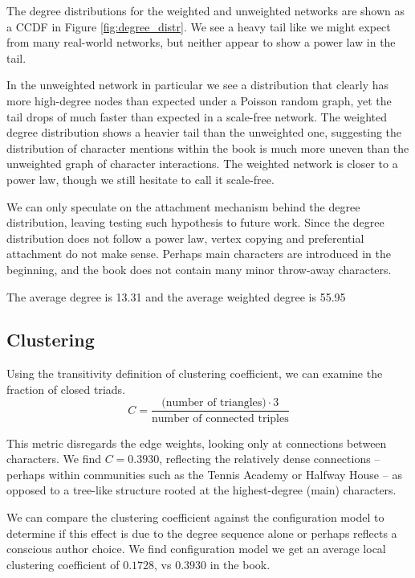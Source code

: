 The degree distributions for the weighted and unweighted networks are shown as a CCDF in Figure \ref{fig:degree_distr}. We see a heavy tail like we might expect from many real-world networks, but neither appear to show a power law in the tail. 

In the unweighted network in particular we see a distribution that clearly has more high-degree nodes than expected under a Poisson random graph, yet the tail drops of much faster than expected in a scale-free network.
The weighted degree distribution shows a heavier tail than the unweighted one, suggesting the distribution of character mentions within the book is much more uneven than the unweighted graph of character interactions. The weighted network is closer to a power law, though we still hesitate to call it scale-free.


We can only speculate on the attachment mechanism behind the degree distribution, leaving testing such hypothesis to future work. Since the degree distribution does not follow a power law, vertex copying and preferential attachment do not make sense. 
Perhaps main characters are introduced in the beginning, and the book does not contain many minor throw-away characters.

The average degree is 13.31 and the average weighted degree is 55.95

\subsection{Clustering}
Using the transitivity definition of clustering coefficient, we can examine the fraction of closed triads.
$$ C = \frac{\text{(number of triangles)} \cdot 3}{\text{number of connected triples}} $$

This metric disregards the edge weights, looking only at connections between characters. We find $C = 0.3930$, reflecting the relatively dense connections -- perhaps within communities such as the Tennis Academy or Halfway House -- as opposed to a tree-like structure rooted at the highest-degree (main) characters.

We can compare the clustering coefficient against the configuration model to determine if this effect is due to the degree sequence alone or perhaps reflects a conscious author choice. We find configuration model we get an average local clustering coefficient of 0$.1728$, vs $0.3930$ in the book. 

